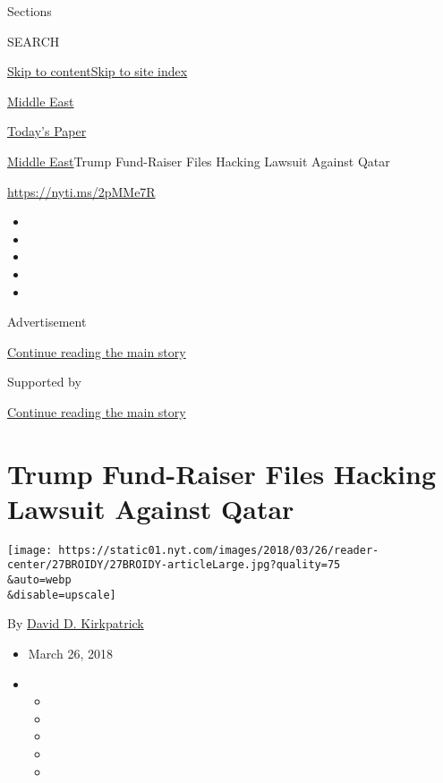 Sections

SEARCH

\protect\hyperlink{site-content}{Skip to
content}\protect\hyperlink{site-index}{Skip to site index}

\href{https://www.nytimes.com/section/world/middleeast}{Middle East}

\href{https://myaccount.nytimes.com/auth/login?response_type=cookie\&client_id=vi}{}

\href{https://www.nytimes.com/section/todayspaper}{Today's Paper}

\href{/section/world/middleeast}{Middle East}\textbar{}Trump Fund-Raiser
Files Hacking Lawsuit Against Qatar

\url{https://nyti.ms/2pMMe7R}

\begin{itemize}
\item
\item
\item
\item
\item
\end{itemize}

Advertisement

\protect\hyperlink{after-top}{Continue reading the main story}

Supported by

\protect\hyperlink{after-sponsor}{Continue reading the main story}

\hypertarget{trump-fund-raiser-files-hacking-lawsuit-against-qatar}{%
\section{Trump Fund-Raiser Files Hacking Lawsuit Against
Qatar}\label{trump-fund-raiser-files-hacking-lawsuit-against-qatar}}

\texttt{[image: https://static01.nyt.com/images/2018/03/26/reader-center/27BROIDY/27BROIDY-articleLarge.jpg?quality=75\\\&auto=webp\\\&disable=upscale]}

By \href{https://www.nytimes.com/by/david-d-kirkpatrick}{David D.
Kirkpatrick}

\begin{itemize}
\item
  March 26, 2018
\item
  \begin{itemize}
  \item
  \item
  \item
  \item
  \item
  \end{itemize}
\end{itemize}

